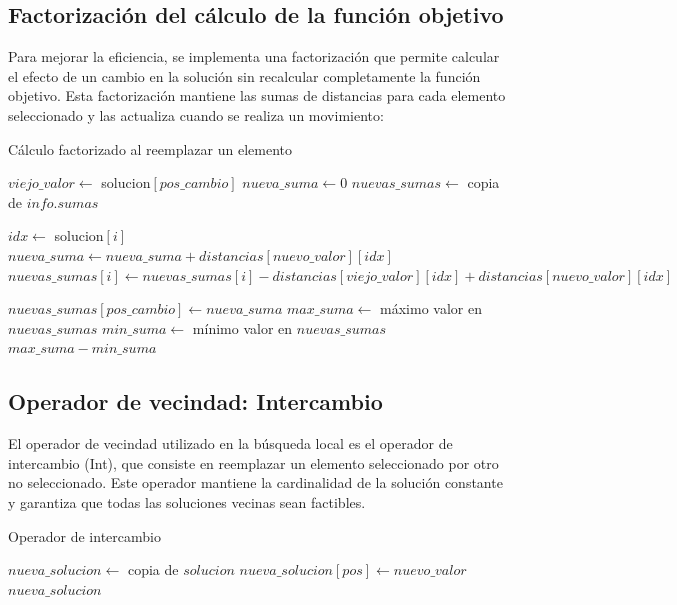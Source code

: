 \documentclass{article}
\begin{document}
\newpage

\subsection{Factorización del cálculo de la función objetivo}

Para mejorar la eficiencia, se implementa una factorización que permite calcular el efecto de un cambio en la solución sin recalcular completamente la función objetivo. Esta factorización mantiene las sumas de distancias para cada elemento seleccionado y las actualiza cuando se realiza un movimiento:

\begin{algorithm}
\caption{Cálculo factorizado al reemplazar un elemento}
\begin{algorithmic}[1]
    \State $viejo\_valor \gets$ solucion$[pos\_cambio]$
    \State $nueva\_suma \gets 0$
    \State $nuevas\_sumas \gets$ copia de $info.sumas$
    
            \State $idx \gets$ solucion$[i]$
            \State $nueva\_suma \gets nueva\_suma + distancias[nuevo\_valor][idx]$
            \State $nuevas\_sumas[i] \gets nuevas\_sumas[i] - distancias[viejo\_valor][idx] + distancias[nuevo\_valor][idx]$
        \EndIf
    \EndFor
    
    \State $nuevas\_sumas[pos\_cambio] \gets nueva\_suma$
    \State $max\_suma \gets$ máximo valor en $nuevas\_sumas$
    \State $min\_suma \gets$ mínimo valor en $nuevas\_sumas$
    \State \Return $max\_suma - min\_suma$
\EndFunction
\end{algorithmic}
\end{algorithm}

\subsection{Operador de vecindad: Intercambio}

El operador de vecindad utilizado en la búsqueda local es el operador de intercambio (Int), que consiste en reemplazar un elemento seleccionado por otro no seleccionado. Este operador mantiene la cardinalidad de la solución constante y garantiza que todas las soluciones vecinas sean factibles.

\begin{algorithm}
\caption{Operador de intercambio}
\begin{algorithmic}[1]
    \State $nueva\_solucion \gets$ copia de $solucion$
    \State $nueva\_solucion[pos] \gets nuevo\_valor$
    \State \Return $nueva\_solucion$
\EndFunction
\end{algorithmic}
\end{algorithm}
\end{document}
